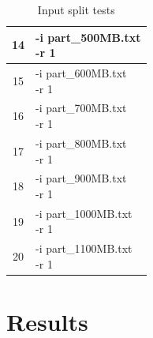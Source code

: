 \documentclass{article}
\begin{document}
\begin{multicols}{2}
\begin{table}[H]
\begin{tabular}{|c|l|}
            14 & \makecell[l]{-i part\_500MB.txt \\ -r 1} \\        
            \hline
            15 & \makecell[l]{-i part\_600MB.txt \\ -r 1} \\        
            \hline
            16 & \makecell[l]{-i part\_700MB.txt \\ -r 1} \\        
            \hline
            17 & \makecell[l]{-i part\_800MB.txt \\ -r 1} \\        
            \hline
            18 & \makecell[l]{-i part\_900MB.txt \\ -r 1} \\        
            \hline
            19 & \makecell[l]{-i part\_1000MB.txt \\ -r 1} \\        
            \hline
            20 & \makecell[l]{-i part\_1100MB.txt \\ -r 1} \\            
            \hline
        \end{tabular}
        \caption{Input split tests}
        \label{tab:input_split_tests}
    \end{table}
\section{Results}


\end{multicols}
\end{document}
